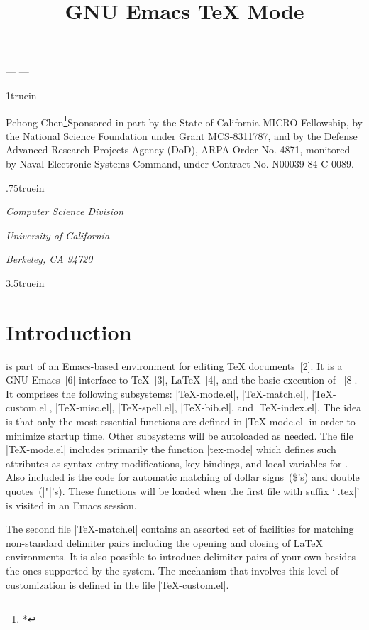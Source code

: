 % 
% 					
%



\title{GNU Emacs {\TeX} Mode}
\bigskip
\centerline{\medbf --- {\version} ---}
\vglue 1truein
\centerline{{\medrm Pehong Chen}\footnote{*}{Sponsored in part by 
the State of California MICRO Fellowship, by
the National Science Foundation under Grant MCS-8311787,
and by the Defense Advanced Research Projects Agency (DoD),
ARPA Order No. 4871, monitored by Naval Electronic Systems Command,
under Contract No. N00039-84-C-0089.}}
\vglue .75truein
\centerline{\sl Computer Science Division}
\centerline{\sl University of California}
\centerline{\sl Berkeley, CA 94720}
\vglue 3.5truein
\centerline{\versiondate}
\vfill\eject
 
\setpagenumbers
{}
\toc

\vfill\eject

\nopagenumbers
{}
\chapter{Introduction}

\noindent
{\TM} is part of an Emacs-based environment for editing {\TeX} documents~[2].
It is a GNU Emacs~[6] interface to {\TeX}~[3], {\LaTeX}~[4],
and the basic execution of {\AmSTeX}~[8].
It comprises the following subsystems: |TeX-mode.el|, |TeX-match.el|, 
|TeX-custom.el|, |TeX-misc.el|, |TeX-spell.el|, |TeX-bib.el|, and
\hbox{|TeX-index.el|}.
The idea is that only the most essential functions are defined in
|TeX-mode.el| in order to minimize {\TM} startup time.
Other subsystems will be autoloaded as needed.
The file |TeX-mode.el| includes primarily the function |tex-mode| which 
defines such attributes as syntax entry modifications,
key bindings, and local variables for {\TM}.  Also included is
the code for automatic matching of dollar signs~(\$'s) 
and double quotes~(|"|'s).  These functions will be loaded
when the first file with suffix `|.tex|' is visited in an Emacs session.

The second file |TeX-match.el| contains an assorted set of facilities for
matching non-standard delimiter pairs
including the opening and closing of {\LaTeX} environments.
It is also possible to introduce delimiter pairs of your own besides
the ones supported by the system.
The mechanism that involves this level of customization is defined in the file
|TeX-custom.el|.

